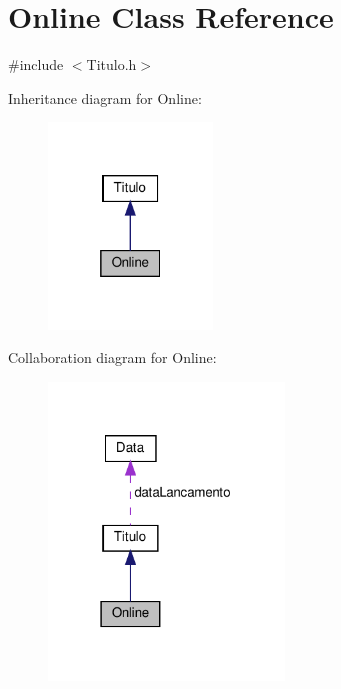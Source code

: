 \hypertarget{classOnline}{}\section{Online Class Reference}
\label{classOnline}


{\ttfamily \#include $<$Titulo.\+h$>$}



Inheritance diagram for Online\+:
\nopagebreak
\begin{figure}[H]
\begin{center}
\leavevmode
\includegraphics[width=124pt]{classOnline__inherit__graph}
\end{center}
\end{figure}


Collaboration diagram for Online\+:
\nopagebreak
\begin{figure}[H]
\begin{center}
\leavevmode
\includegraphics[width=178pt]{classOnline__coll__graph}
\end{center}
\end{figure}
